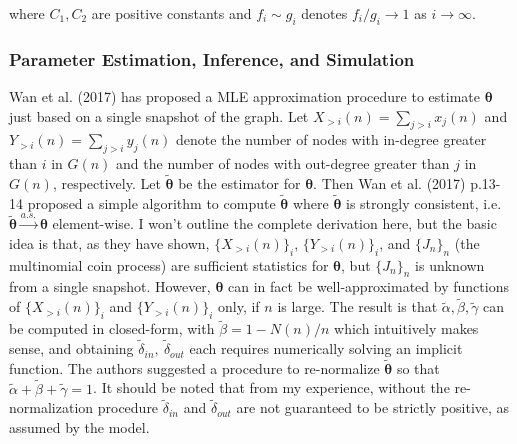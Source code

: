 \documentclass[]{elsarticle} %
\begin{document}
\noindent where \(C_{1}, C_{2}\) are positive constants and
\(f_i \sim g_i\) denotes \(f_i/g_i \to 1\) as \(i \to \infty\).

\subsubsection{Parameter Estimation, Inference, and
Simulation}\label{parameter-estimation-inference-and-simulation}

Wan et al. (2017) has proposed a MLE approximation procedure to estimate
\(\boldsymbol{\theta}\) just based on a single snapshot of the graph.
Let \(X_{> i}(n) = \sum_{j > i}x_{j}(n)\) and
\(Y_{>i}(n) = \sum_{j > i} y_j(n)\) denote the number of nodes with
in-degree greater than \(i\) in \(G(n)\) and the number of nodes with
out-degree greater than \(j\) in \(G(n)\), respectively. Let
\(\boldsymbol{\tilde{\theta}}\) be the estimator for
\(\boldsymbol{\theta}\). Then Wan et al. (2017) p.13-14 proposed a
simple algorithm to compute \(\boldsymbol{\tilde{\theta}}\) where
\(\boldsymbol{\tilde{\theta}}\) is strongly consistent, i.e.
\(\boldsymbol{\tilde{\theta}} \overset{a.s.}{\to} \boldsymbol{\theta}\)
element-wise. I won't outline the complete derivation here, but the
basic idea is that, as they have shown, \(\{ X_{> i}(n) \}_{i}\),
\(\{ Y_{>i}(n) \}_{i}\), and \(\{ J_n \}_{n}\) (the multinomial coin
process) are sufficient statistics for \(\boldsymbol{\theta}\), but
\(\{ J_n \}_n\) is unknown from a single snapshot. However,
\(\boldsymbol{\theta}\) can in fact be well-approximated by functions of
\(\{ X_{> i}(n) \}_{i}\) and \(\{ Y_{>i}(n) \}_{i}\) only, if \(n\) is
large. The result is that
\(\tilde{\alpha}, \tilde{\beta}, \tilde{\gamma}\) can be computed in
closed-form, with \(\tilde{\beta} = 1 - N(n)/n\) which intuitively makes
sense, and obtaining \(\tilde{\delta}_{in},\ \tilde{\delta}_{out}\) each
requires numerically solving an implicit function. The authors suggested
a procedure to re-normalize \(\tilde{\boldsymbol{\theta}}\) so that
\(\tilde{\alpha} + \tilde{\beta} + \tilde{\gamma} = 1\). It should be
noted that from my experience, without the re-normalization procedure
\(\tilde{\delta}_{in}\) and \(\tilde{\delta}_{out}\) are not guaranteed
to be strictly positive, as assumed by the model.
\end{document}
